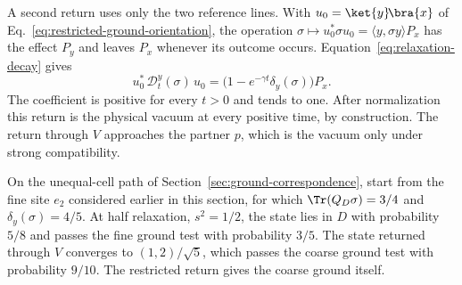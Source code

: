 A second return uses only the two reference lines. With $u_0=\ket{y}\!\bra{x}$ of Eq.~\eqref{eq:restricted-ground-orientation}, the operation $\sigma\mapsto u_0^*\sigma u_0=\langle y,\sigma y\rangle P_x$ has the effect $P_y$ and leaves $P_x$ whenever its outcome occurs. Equation~\eqref{eq:relaxation-decay} gives
\begin{equation}
 u_0^*\,\mathcal D_t^y(\sigma)\,u_0=\bigl(1-e^{-\gamma t}\delta_y(\sigma)\bigr)P_x .
 \label{eq:relaxation-restricted-return}
\end{equation}
The coefficient is positive for every $t>0$ and tends to one. After normalization this return is the physical vacuum at every positive time, by construction. The return through $V$ approaches the partner $p$, which is the vacuum only under strong compatibility.

On the unequal-cell path of Section~\ref{sec:ground-correspondence}, start from the fine site $e_2$ considered earlier in this section, for which $\Tr(Q_D\sigma)=3/4$ and $\delta_y(\sigma)=4/5$. At half relaxation, $s^2=1/2$, the state lies in $D$ with probability $5/8$ and passes the fine ground test with probability $3/5$. The state returned through $V$ converges to $(1,2)/\sqrt5$, which passes the coarse ground test with probability $9/10$. The restricted return gives the coarse ground itself.
